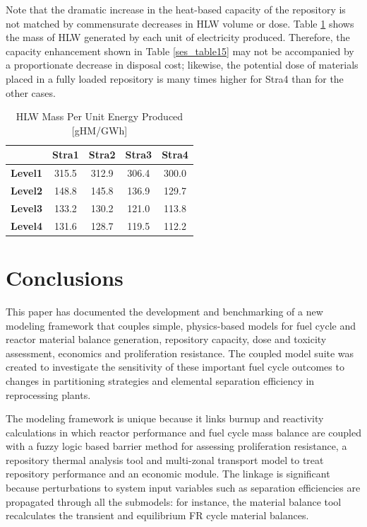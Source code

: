 Note that the dramatic increase in the heat-based capacity of the
repository is not matched by commensurate decreases in HLW volume or
dose.  Table \ref{ses_table17} shows the mass of HLW generated by each unit of
electricity produced. Therefore, the capacity
enhancement shown in Table \ref{ses_table15} may not be accompanied by a proportionate
decrease in disposal cost; likewise, the potential dose of materials
placed in a fully loaded repository is many times higher for Stra4 than
for the other cases.  

\begin{table}[htbp]
\begin{center}
\caption{HLW Mass Per Unit Energy Produced [gHM/GWh]}
\label{ses_table17}
\begin{tabular}{|l|c|c|c|c|}
\hline
                & \textbf{Stra1} & \textbf{Stra2} & \textbf{Stra3} & \textbf{Stra4} \\
\hline
\textbf{Level1} & 315.5          & 312.9          & 306.4          & 300.0 \\
\textbf{Level2} & 148.8          & 145.8          & 136.9          & 129.7 \\
\textbf{Level3} & 133.2          & 130.2          & 121.0          & 113.8 \\
\textbf{Level4} & 131.6          & 128.7          & 119.5          & 112.2 \\
\hline
\end{tabular}
\end{center}
\end{table}




\section{Conclusions}
\label{ses_sec:conclusions}
This paper has documented the development and benchmarking of a new
modeling framework that couples simple, physics-based models for fuel
cycle and reactor material balance generation, repository capacity, dose
and toxicity assessment, economics and proliferation resistance.  The
coupled model suite was created to investigate the sensitivity of these
important fuel cycle outcomes to changes in partitioning strategies and
elemental separation efficiency in reprocessing plants.

The modeling framework is unique because it links burnup and reactivity
calculations in which reactor performance and fuel cycle mass balance
are coupled with a fuzzy logic based barrier method for assessing
proliferation resistance, a repository thermal analysis tool and
multi-zonal transport model to treat repository performance and an
economic module.  The linkage is significant because perturbations to
system input variables such as separation efficiencies are propagated
through all the submodels: for instance, the material balance tool
recalculates the transient and equilibrium FR cycle material balances.

